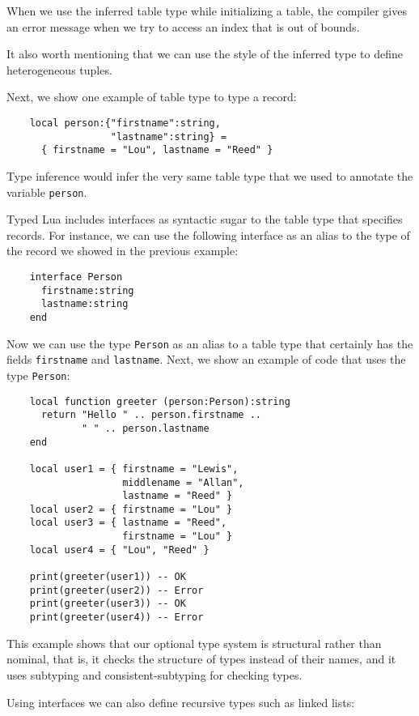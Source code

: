 \documentclass[preprint]{sig-alternate}
\begin{document}
When we use the inferred table type while initializing a table, the
compiler gives an error message when we try to access an index that
is out of bounds.

It also worth mentioning that we can use the style of the inferred
type to define heterogeneous tuples.

Next, we show one example of table type to type a record:
\begin{verbatim}
    local person:{"firstname":string,
                  "lastname":string} =
      { firstname = "Lou", lastname = "Reed" } 
\end{verbatim}

Type inference would infer the very same table type that we used to
annotate the variable \verb'person'.

Typed Lua includes interfaces as syntactic sugar to the table type
that specifies records.
For instance, we can use the following interface as an alias to the
type of the record we showed in the previous example:
\begin{verbatim}
    interface Person
      firstname:string
      lastname:string
    end
\end{verbatim}

Now we can use the type \verb'Person' as an alias to a table type
that certainly has the fields \verb'firstname' and \verb'lastname'.
Next, we show an example of code that uses the type \verb'Person':
\begin{verbatim}
    local function greeter (person:Person):string
      return "Hello " .. person.firstname ..
             " " .. person.lastname
    end

    local user1 = { firstname = "Lewis",
                    middlename = "Allan",
                    lastname = "Reed" }
    local user2 = { firstname = "Lou" }
    local user3 = { lastname = "Reed",
                    firstname = "Lou" }
    local user4 = { "Lou", "Reed" }

    print(greeter(user1)) -- OK
    print(greeter(user2)) -- Error
    print(greeter(user3)) -- OK
    print(greeter(user4)) -- Error
\end{verbatim}

This example shows that our optional type system is structural rather
than nominal, that is, it checks the structure of types instead of
their names, and it uses subtyping and consistent-subtyping for
checking types.

Using interfaces we can also define recursive types such as linked
lists:
\end{document}
